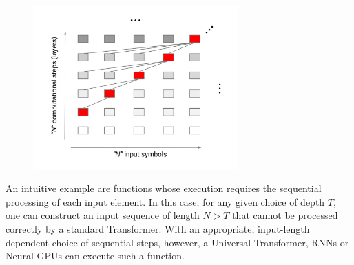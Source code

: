 \begin{figure}[t]
\centering
\includegraphics[width=0.7\textwidth, trim={0.1cm 0.5cm 0.1cm 1.2cm}, clip]{04-part-03/chapter-06/figs_and_tables/fig_universality_example.png}
\end{figure}

An intuitive example are functions whose execution requires the sequential processing of each input element. In this case, for any given choice of depth $T$, one can construct an input sequence of length $N>T$ that cannot be processed correctly by a standard Transformer. With an appropriate, input-length dependent choice of sequential steps, however, a Universal Transformer, RNNs or Neural GPUs can execute such a function.